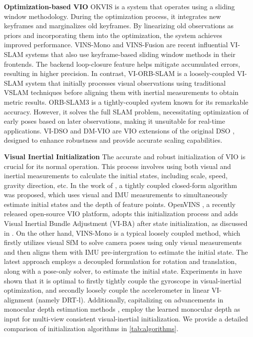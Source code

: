 \textbf{Optimization-based VIO }OKVIS \cite{leutenegger-ijrr-2015-OKVIS} is a system that operates using a sliding window methodology. During the optimization process, it integrates new keyframes and marginalizes old keyframes. By linearizing old observations as priors and incorporating them into the optimization, the system achieves improved performance. VINS-Mono \cite{qin-tro-2018_VINS-Mono} and VINS-Fusion \cite{qin2019a_VINS_Fusion_Local,qin2019b_VINS_Fusion_Global} are recent influential VI-SLAM systems that also use keyframe-based sliding window methods in their frontends. The backend loop-closure feature helps mitigate accumulated errors, resulting in higher precision. In contrast, VI-ORB-SLAM \cite{murartal-ral-2017-VI-ORB} is a loosely-coupled VI-SLAM system that initially processes visual observations using traditional VSLAM techniques before aligning them with inertial measurements to obtain metric results. ORB-SLAM3 \cite{campos2021orb-slam3} is a tightly-coupled system known for its remarkable accuracy. However, it solves the full SLAM problem, necessitating optimization of early poses based on later observations, making it unsuitable for real-time applications. VI-DSO \cite{von2018direct-VI-DSO} and DM-VIO \cite{stumberg22DM-VIO} are VIO extensions of the original DSO \cite{engel2018direct_DSO}, designed to enhance robustness and provide accurate scaling capabilities.

\textbf{Visual Inertial Initialization} The accurate and robust initialization of VIO is crucial for its normal operation. This process involves using both visual and inertial measurements to calculate the initial states, including scale, speed, gravity direction, etc. In the work of \cite{Dong-Si_initialization}, a tightly coupled closed-form algorithm was proposed, which uses visual and IMU measurements to simultaneously estimate initial states and the depth of feature points. OpenVINS \cite{geneva2020openvins}, a recently released open-source VIO platform, adopts this initialization process and adds Visual Inertial Bundle Adjustment \cite{triggs1999bundle} (VI-BA) after state initialization, as discussed in \cite{genevaopenvins}. On the other hand, VINS-Mono\cite{qin-tro-2018_VINS-Mono} is a typical loosely coupled method, which firstly utilizes visual SfM to solve camera poses using only visual measurements and then aligns them with IMU pre-intergration \cite{forster2017manifold-preintergration} to estimate the initial state. 
The latest approach \cite{Rotation-Translation-Decoupled} employs a decoupled formulation for rotation and translation, along with a pose-only solver, to estimate the initial state. Experiments in \cite{Rotation-Translation-Decoupled} have shown that it is optimal to firstly tightly couple the gyroscope in visual-inertial optimization, and secondly loosely couple the accelerometer in linear VI-alignment (namely DRT-l). Additionally, capitalizing on advancements in monocular depth estimation methods \cite{ranftl2020towards}, \cite{Mono-Depth-VI-Init-2022,merrill2023fast} employ the learned monocular depth as input for multi-view consistent visual-inertial initialization. We provide a detailed comparison of initialization algorithms in \cref{tab:algorithms}. 


